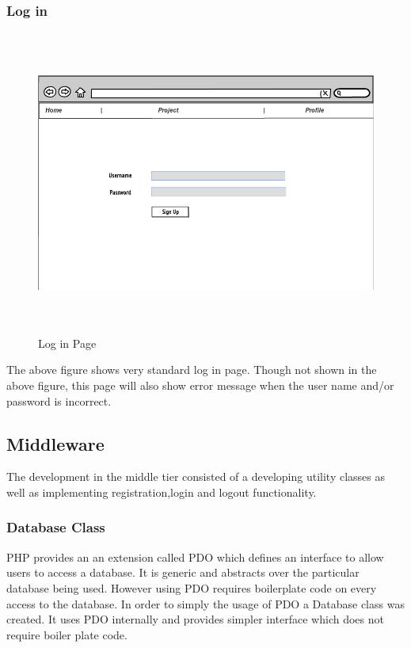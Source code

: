 \documentclass[a4paper,oneside,11pt]{report}
\begin{document}
\subsubsection{Log in}
\begin{figure}[!ht]
\centering
\includegraphics[width=\textwidth,height=10cm]{Log_in.jpg}
\caption{Log in Page}
\end{figure}

The above figure shows very standard log in page. Though not shown in the above figure, this page will also show error message when the user name and/or password is incorrect.
\subsection{Middleware}
The development in the middle tier consisted of a developing utility classes as well as implementing registration,login and logout functionality.

\subsubsection{Database Class}
PHP provides an an extension called PDO which defines an interface to allow users to access a database. It is generic and abstracts over the particular database being used. However using PDO requires boilerplate code on every access to the database. In order to simply the usage of PDO a Database class was created. It uses PDO internally and provides simpler interface which does not require boiler plate code. 
\end{document}
